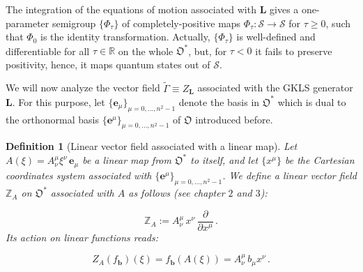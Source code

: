 \documentclass[11pt]{article}
\newcommand{\be}{\begin{equation}}
\newcommand{\ee}{\end{equation}}
\newcommand{\vsp}{\vspace{0.4cm}}
\newcommand{\stsp}{\mathcal{S}}
\newcommand{\obsp}{\mathfrak{O}}
\newtheorem{defn}{Definition}
\begin{document}



\vsp

The integration of the equations of motion associated with $\mathbf{L}$ gives a one-parameter semigroup $\{\Phi_{\tau}\}$ of completely-positive maps $\Phi_{\tau}:\stsp\rightarrow\stsp$ for $\tau\geq0$, such that $\Phi_{0}$ is the identity transformation.
Actually, $\{\Phi_{\tau}\}$ is well-defined and differentiable for all $\tau\in\mathbb{R}$ on the whole $\obsp^{*}$, but, for $\tau<0$ it fails to preserve positivity, hence, it maps quantum states out of $\stsp$.


We will now analyze the vector field $\widetilde{\Gamma}\equiv Z_{\mathbf{L}}$ associated with the GKLS generator $\mathbf{L}$.
For this purpose, let $\{\mathbf{e}_{\mu}\}_{\mu=0,...,n^{2}-1}$ denote the basis in $\obsp^{*}$ which is dual to the orthonormal basis $\{\mathbf{e}^{\mu}\}_{\mu=0,...,n^{2}-1}$ of $\obsp$ introduced before.

\begin{defn}[Linear vector field associated with a linear map]\label{def: linear vector field from linear map}
Let $A(\xi)=A^{\mu}_{\nu}\xi^{\nu}\,\mathbf{e}_{\mu}$ be a linear map from $\obsp^{*}$ to itself, and let $\{x^{\mu}\}$ be the Cartesian coordinates system associated with $\{\mathbf{e}^{\mu}\}_{\mu=0,...,n^{2}-1}$.
We define a linear vector field $\mathbb{Z}_{A}$ on $\obsp^{*}$ associated with $A$ as follows (see \cite{carinena_ibort_marmo_morandi-geometry_from_dynamics_classical_and_quantum} chapter $2$ and $3$):

\be\label{eqn: linear vector field from linear map}
\mathbb{Z}_{A}:=A^{\mu}_{\nu}\,x^{\nu}\,\frac{\partial}{\partial x^{\mu}}\,.
\ee
Its action on linear functions reads:

\be
Z_{A}(f_{\mathbf{b}})(\xi)=f_{\mathbf{b}}(A(\xi))=A^{\mu}_{\nu}\,b_{\mu}x^{\nu}\,.
\ee
\end{defn}
\end{document}
